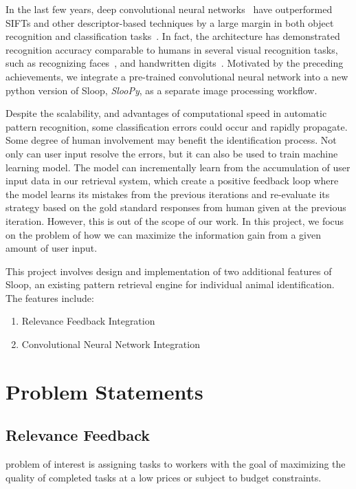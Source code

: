 In the last few years, deep convolutional neural networks~\cite{lecun95, kriz12}
have outperformed SIFTs and other descriptor-based techniques by a large margin
in both object recognition and classification tasks~\cite{kriz12, fisher14,
ILSVRC15}. In fact, the architecture has demonstrated recognition accuracy
comparable to humans in several visual recognition tasks, such as recognizing
faces~\cite{deepface14}, and handwritten digits~\cite{mnist13}. Motivated by the
preceding achievements, we integrate a pre-trained convolutional neural network
into a new python version of Sloop, \emph{SlooPy}, as a separate image
processing workflow.

Despite the scalability, and advantages of computational speed in automatic
pattern recognition, some classification errors could occur and rapidly
propagate. Some degree of human involvement may benefit the identification
process. Not only can user input resolve the errors, but it can also be used to
train machine learning model. The model can incrementally learn from the
accumulation of user input data in our retrieval system, which create a
positive feedback loop where the model learns its mistakes from the previous
iterations and re-evaluate its strategy based on the gold standard responses
from human given at the previous iteration. However, this is out of the scope
of our work. In this project, we focus on the problem of how we can maximize
the information gain from a given amount of user input.

This project involves design and implementation of two additional features of
Sloop, an existing pattern retrieval engine for individual animal
identification. The features include: \begin{enumerate} \item Relevance
Feedback Integration \item Convolutional Neural Network Integration
\end{enumerate}

\section{Problem Statements}

\subsection{Relevance Feedback} %
problem of interest is assigning tasks to workers with the goal of maximizing
the quality of completed tasks at a low prices or subject to budget
constraints.


